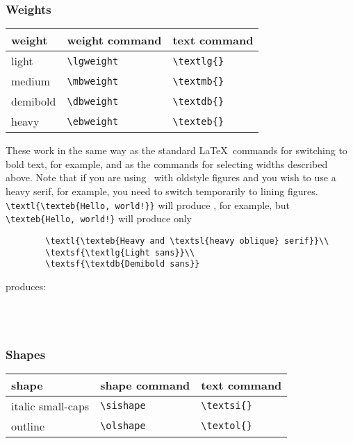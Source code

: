 \documentclass[11pt,british]{article}
\begin{document}
\subsubsection{Weights}

	\begin{longtable}{lll}
		\toprule
		\textbf{weight}		&	\textbf{weight command}	&	\textbf{text command}\\\midrule\endhead
		\bottomrule\endfoot
		light							&	\verb|\lgweight|						&	\verb|\textlg{}|\\
		medium						&	\verb|\mbweight|					&	\verb|\textmb{}|\\
		demibold					&	\verb|\dbweight|					&	\verb|\textdb{}|\\
		heavy							&	\verb|\ebweight|					&	\verb|\texteb{}|\\
	\end{longtable}
	
	These work in the same way as the standard \LaTeX\ commands for switching to bold text, for example, and as the commands for selecting widths described above. Note that if you are using \ with oldstyle figures and you wish to use a heavy serif, for example, you need to switch temporarily to lining figures. \verb|\textl{\texteb{Hello, world!}}| will produce , for example, but \verb|| will produce only \texteb{Hello, world!}
	\begin{verbatim}
		\textl{\texteb{Heavy and \textsl{heavy oblique} serif}}\\
		\textsf{\textlg{Light sans}}\\
		\textsf{\textdb{Demibold sans}}
	\end{verbatim}
	produces:
	\begin{center}
		\\
		\textsf{}\\
		\textsf{}
	\end{center}

\subsubsection{Shapes}

	\begin{longtable}{lll}
		\toprule
		\textbf{shape}		&	\textbf{shape command}	&	\textbf{text command}\\\midrule\endhead
		\bottomrule\endfoot
		italic small-caps		&	\verb|\sishape|					&	\verb|\textsi{}|\\
		outline						&	\verb|\olshape|					&	\verb|\textol{}|\\		
	\end{longtable}
		
\end{document}
